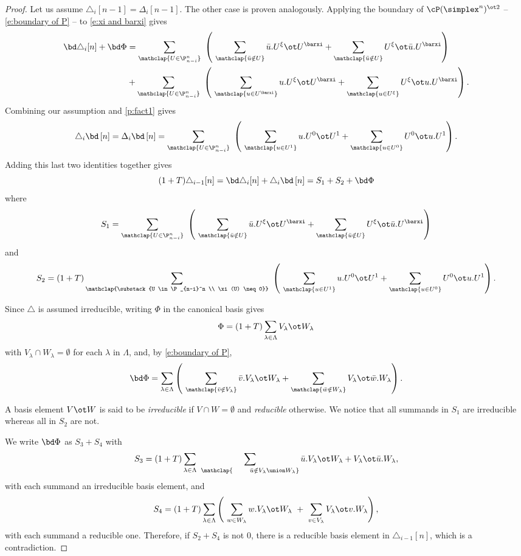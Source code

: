 \begin{proof}
	Let us assume $\triangle_i [n-1] = \Delta_i [n-1]$.
	The other case is proven analogously.
	Applying the boundary of $\cP(\simplex^n)^{\ot 2}$ -- \cref{e:boundary of P} -- to \cref{e:xi and barxi} gives
	\begin{align*}
		\bd \triangle_i [n] + \bd \Phi& =
		\sum_{\mathclap{U \in \P_{n-i}^n}} \
		\left(\
		\sum_{\mathclap{\bar u \notin U}} \bar u.U^\xi \ot U^\barxi +
		\sum_{\mathclap{\bar u \notin U}} U^\xi \ot \bar u.U^\barxi
		\right) \\ & +
		\sum_{\mathclap{U \in \P_{n-i}^n}} \
		\left(\
		\sum_{\mathclap{u \in U^\barxi}} u.U^\xi \ot U^\barxi +
		\sum_{\mathclap{u \in U^{\xi}}} U^\xi \ot u.U^\barxi
		\right).
	\end{align*}
	Combining our assumption and \cref{p:fact1} gives
	\[
	\triangle_i \bd \, [n] =
	\Delta_i \bd \, [n] =
	\sum_{\mathclap{U \in \P_{n-i}^n}} \
	\left(\
	\sum_{\mathclap{u \in U^1}} u.U^0 \ot U^1 +
	\sum_{\mathclap{u \in U^0}} U^0 \ot u.U^1
	\right).
	\]
	Adding this last two identities together gives
	\[
	(1+T) \triangle_{i-1} [n] =
	\bd \triangle_i [n] + \triangle_i \bd \, [n] =
	S_1 + S_2 + \bd \Phi
	\]
	where
	\[
	S_1 = \sum_{\mathclap{U \in \P_{n-i}^n}} \
	\left(\
	\sum_{\mathclap{\bar u \notin U}} \bar u.U^\xi \ot U^\barxi +
	\sum_{\mathclap{\bar u \notin U}} U^\xi \ot \bar u.U^\barxi
	\right)
	\]
	and
	\[
	S_2 = (1+T) \sum_{\mathclap{\substack{U \in \P_{n-i}^n \\ \xi(U) \neq 0}}} \
	\left(\
	\sum_{\mathclap{u \in U^1}} u.U^0 \ot U^1 +
	\sum_{\mathclap{u \in U^0}} U^0 \ot u.U^1
	\right).
	\]

	Since $\triangle$ is assumed irreducible, writing $\Phi$ in the canonical basis gives
	\[
	\Phi = (1+T)\sum_{\lambda\in\Lambda} V_\lambda \ot W_\lambda
	\]
	with $V_\lambda \cap W_\lambda = \emptyset$ for each $\lambda$ in $\Lambda$, and, by \cref{e:boundary of P},
	\[
	\bd\Phi = \sum_{\lambda\in\Lambda}
	\left(\
	\sum_{\mathclap{\bar v \notin V_\lambda}} \bar v.V_\lambda \ot W_\lambda +
	\sum_{\mathclap{\bar w \notin W_\lambda}} V_\lambda \ot \bar w.W_\lambda
	\right).
	\]

	A basis element $V \ot W$ is said to be \textit{irreducible} if $V \cap W = \emptyset$ and \textit{reducible} otherwise.
	We notice that all summands in $S_1$ are irreducible whereas all in $S_2$ are not.

	We write $\bd\Phi$ as $S_3 + S_4$ with
	\[
	S_3 = (1+T)\sum_{\lambda\in\Lambda} \
	\sum_{\mathclap{\hspace*{20pt}\bar u \notin V_\lambda \union W_\lambda}} \bar u.V_\lambda \ot W_\lambda + V_\lambda \ot \bar u.W_\lambda,
	\]
	with each summand an irreducible basis element, and
	\[
	S_4 = (1+T)\sum_{\lambda\in\Lambda}
	\left(\
	\sum_{w \in W_\lambda} w.V_\lambda \ot W_\lambda \ + \
	\sum_{v \in V_\lambda} V_\lambda \ot v.W_\lambda
	\right),
	\]
	with each summand a reducible one.
	Therefore, if $S_2 + S_4$ is not $0$, there is a reducible basis element in $\triangle_{i-1}[n]$, which is a contradiction.


\end{proof}
